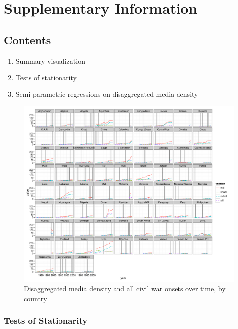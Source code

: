 \documentclass[11pt,article,oneside]{memoir}
\makeatletter
\def\maxwidth{\ifdim\Gin@nat@width>\linewidth\linewidth
\else\Gin@nat@width\fi}
\let\Oldincludegraphics\includegraphics
\renewcommand{\includegraphics}[1]{\Oldincludegraphics[width=\maxwidth]{#1}}
\makeatother
\begin{document}
\clearpage

\section{Supplementary Information}\label{supplementary-information}

\subsection{Contents}\label{contents}

\begin{enumerate}
\def\labelenumi{\arabic{enumi}.}
\itemsep1pt\parskip0pt
\item
  Summary visualization
\item
  Tests of stationarity
\item
  Semi-parametric regressions on disaggregated media density
\end{enumerate}

\begin{figure}[htbp]
\centering
\includegraphics{./media_civil_war_files/figure-markdown/full_panel_plot.pdf}
\caption{Disaggregated media density and all civil war onsets over time,
by country}
\end{figure}

\subsubsection{Tests of Stationarity}\label{tests-of-stationarity}
\end{document}
